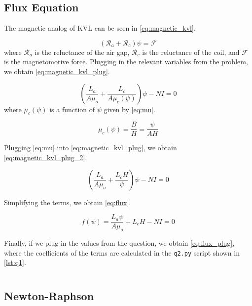 \documentclass[a4paper,titlepage]{article}
\begin{document}
	\subsection{Flux Equation}
	The magnetic analog of KVL can be seen in \cref{eq:magnetic_kvl}.

	\begin{equation} \label{eq:magnetic_kvl}
		(\mathcal{R}_a + \mathcal{R}_c) \psi = \mathcal{F}
	\end{equation}
	where $\mathcal{R}_a$ is the reluctance of the air gap, $\mathcal{R}_c$ is the reluctance of the coil, and $\mathcal{F}$ is the magnetomotive force. Plugging in the relevant variables from the problem, we obtain \cref{eq:magnetic_kvl_plug}.

	\begin{equation} \label{eq:magnetic_kvl_plug}
		\left( \frac{L_a}{A \mu_o} + \frac{L_c}{A \mu_c(\psi)} \right) \psi - NI = 0
	\end{equation}
	where $\mu_c(\psi)$ is a function of $\psi$ given by \cref{eq:mu}.
	
	\begin{equation} \label{eq:mu}
		\mu_c(\psi) = \frac{B}{H} = \frac{\psi}{A H}
	\end{equation}
	
	Plugging \cref{eq:mu} into \cref{eq:magnetic_kvl_plug}, we obtain \cref{eq:magnetic_kvl_plug_2}.
	
	\begin{equation} \label{eq:magnetic_kvl_plug_2}
		\left( \frac{L_a}{A \mu_o} + \frac{L_c H}{\psi} \right) \psi - NI = 0
	\end{equation}
	
	Simplifying the terms, we obtain \cref{eq:flux}.
	
	\begin{equation} \label{eq:flux}
		f(\psi) = \frac{L_a \psi}{A \mu_o} + L_c H - NI = 0
	\end{equation}
	
	Finally, if we plug in the values from the question, we obtain \cref{eq:flux_plug}, where the coefficients of the terms are calculated in the \texttt{q2.py} script shown in \cref{lst:q1}.
	
	\begin{equation} \label{eq:flux_plug}
		
	\end{equation}
	
	\subsection{Newton-Raphson}
	
\end{document}
